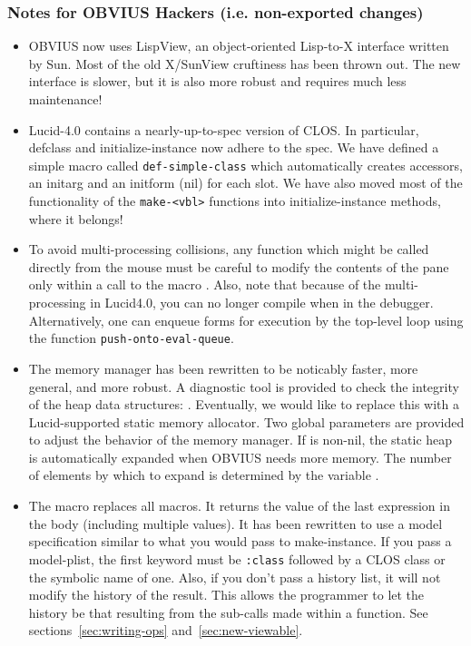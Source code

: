 \subsubsection{Notes for OBVIUS Hackers (i.e. non-exported changes)}

\begin{itemize}

\item OBVIUS now uses LispView, an object-oriented Lisp-to-X interface
written by Sun.  Most of the old X/SunView cruftiness has been thrown
out.  The new interface is slower, but it is also more robust and
requires much less maintenance!

\item Lucid-4.0 contains a nearly-up-to-spec version of CLOS.  In
particular, defclass and initialize-instance now adhere to the spec.
We have defined a
simple macro called {\tt def-simple-class} which automatically creates
accessors, an initarg and an initform (nil) for each slot.
We have also moved most of the functionality of the {\tt make-<vbl>} functions
into initialize-instance methods, where it belongs!

\item To avoid multi-processing collisions, any function which might
be called directly from the mouse must be careful to modify the
contents of the pane only within a call to the macro
.  Also, note that because of the
multi-processing in Lucid4.0, you can no longer compile when in the
debugger.  Alternatively, one can enqueue forms for execution by the
top-level loop using the function {\tt push-onto-eval-queue}.

\item The memory manager has been rewritten to be noticably faster,
more general, and more robust.  A diagnostic tool is provided to check
the integrity of the heap data structures:
. Eventually, we would like to
replace this with a Lucid-supported static memory allocator.  Two
global parameters are provided to adjust the behavior of the memory
manager. If  is non-nil, the static heap is
automatically expanded when OBVIUS needs more memory.  The number of
elements by which to expand is determined by the variable .

\item The  macro replaces all 
 macros.  It returns the value of the last
expression in the body (including multiple values).  It has been
rewritten to use a model specification similar to what you would pass
to make-instance.  If you pass a model-plist, the first keyword must
be {\tt :class} followed by a CLOS class or the symbolic name of one.
Also, if you don't pass a history list, it will not modify the history
of the result.  This allows the programmer to let the history be that
resulting from the sub-calls made within a function.  See
sections~\ref{sec:writing-ops} and~\ref{sec:new-viewable}.


\end{itemize}
